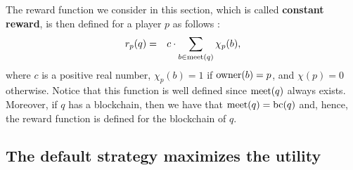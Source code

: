 The reward function we consider in this section, which is called \textbf{constant reward}, is then defined for a player $p$ as follows : 
%
%
\begin{eqnarray*}
r_p(q) & = & 
{\displaystyle c \cdot \sum_{b \in \text{\rm meet}(q)} \chi_p(b),}
\end{eqnarray*}
where $c$ is a positive real number, $\chi_p(b) = 1$ if $\text{\rm owner}(b) = p$, and $\chi(p) = 0$ otherwise.
Notice that this function is well defined since $\text{\rm meet}(q)$ always exists. Moreover, if $q$ has a blockchain, then we have that $\text{\rm meet}(q) = \text{bc}(q)$ and, hence, the reward function is defined for the blockchain of $q$.
 
 \subsection{The default strategy maximizes the utility}


